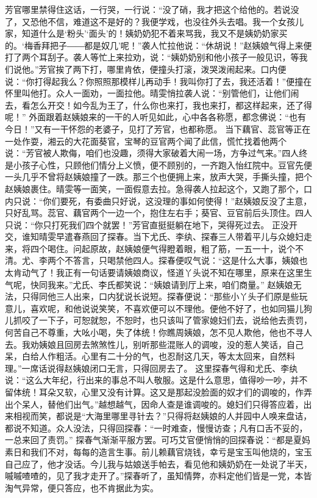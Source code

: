\documentclass[12pt,oneside]{book}
\begin{document}
芳官哪里禁得住这话，一行哭，一行说：“没了硝，我才把这个给他的。若说没了，又恐他不信，难道这不是好的？我便学戏，也没往外头去唱。我一个女孩儿家，知道什么是‘粉头’‘面头’的！姨奶奶犯不着来骂我，我又不是姨奶奶家买的。‘梅香拜把子――都是奴几’呢！”袭人忙拉他说：“休胡说！”赵姨娘气得上来便打了两个耳刮子。袭人等忙上来拉劝，说：“姨奶奶别和他小孩子一般见识，等我们说他。”芳官挨了两下打，哪里肯依，便撞头打滚，泼哭泼闹起来。口内便说：“你打得起我么？你照照那模样儿再动手！我叫你打了去，我还活着！”便撞在怀里叫他打。众人一面劝，一面拉他。晴雯悄拉袭人说：“别管他们，让他们闹去，看怎么开交！如今乱为王了，什么你也来打，我也来打，都这样起来，还了得呢！”
外面跟着赵姨娘来的一干的人听见如此，心中各各称愿，都念佛说：“也有今日！”又有一干怀怨的老婆子，见打了芳官，也都称愿。
当下藕官、蕊官等正在一处作耍，湘云的大花面葵官，宝琴的豆官两个闻了此信，慌忙找着他两个说：“芳官被人欺侮，咱们也没趣，须得大家破着大闹一场，方争过气来。”四人终是小孩子心性，只顾他们情分上义愤，便不顾别的，一齐跑入怡红院中。豆官先便一头几乎不曾将赵姨娘撞了一跌。那三个也便拥上来，放声大哭，手撕头撞，把个赵姨娘裹住。晴雯等一面笑，一面假意去拉。急得袭人拉起这个，又跑了那个，口内只说：“你们要死，有委曲只好说，这没理的事如何使得！”赵姨娘反没了主意，只好乱骂。蕊官、藕官两个一边一个，抱住左右手；葵官、豆官前后头顶住。四人只说：“你只打死我们四个就罢！”芳官直挺挺躺在地下，哭得死过去。
正没开交，谁知晴雯早遣春燕回了探春。当下尤氏、李纨、探春三人带着平儿与众媳妇走来，将四个喝住。问起原故，赵姨娘便气得瞪着眼，粗了筋，一五一十，说个不清。尤、李两个不答言，只喝禁他四人。探春便叹气说：“这是什么大事，姨娘也太肯动气了！我正有一句话要请姨娘商议，怪道丫头说不知在哪里，原来在这里生气呢，快同我来。”尤氏、李氏都笑说：“姨娘请到厅上来，咱们商量。”
赵姨娘无法，只得同他三人出来，口内犹说长说短。探春便说：“那些小丫头子们原是些玩意儿，喜欢呢，和他说说笑笑，不喜欢便可以不理他。便他不好了，也如同猫儿狗儿抓咬了一下子，可恕就恕，不恕时，也只该叫了管家媳妇们去，说给他去责罚，何苦自己不尊重，大吆小喝，失了体统！你瞧周姨娘，怎不见人欺他，他也不寻人去。我劝姨娘且回房去煞煞性儿，别听那些混账人的调唆，没的惹人笑话，自己呆，白给人作粗活。心里有二十分的气，也忍耐这几天，等太太回来，自然料理。”一席话说得赵姨娘闭口无言，只得回房去了。
这里探春气得和尤氏、李纨说：“这么大年纪，行出来的事总不叫人敬服。这是什么意思，值得吵一吵，并不留体统！耳朵又软，心里又没有计算。这又是那起没脸面的奴才们的调唆的，作弄出个呆人，替他们出气。”越想越气，因命人查是谁调唆的。媳妇们只得答应着，出来相视而笑，都说是“大海里哪里寻针去？”只得将赵姨娘的人并园中人唤来盘诘，都说不知道。众人没法，只得回探春：“一时难查，慢慢访查；凡有口舌不妥的，一总来回了责罚。”
探春气渐渐平服方罢。可巧艾官便悄悄的回探春说：“都是夏妈素日和我们不对，每每的造言生事。前儿赖藕官烧钱，幸亏是宝玉叫他烧的，宝玉自己应了，他才没话。今儿我与姑娘送手帕去，看见他和姨奶奶在一处说了半天，嘁嘁喳喳的，见了我才走开了。”探春听了，虽知情弊，亦料定他们皆是一党，本皆淘气异常，便只答应，也不肯据此为实。
\end{document}
